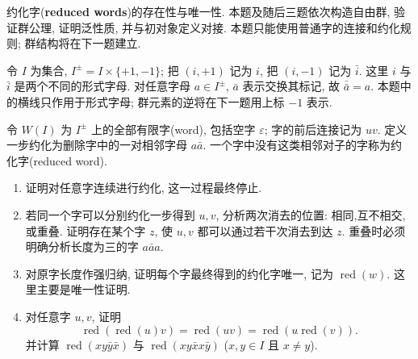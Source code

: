 \documentclass{article}
\begin{document}
\begin{problem}
  {\heiti 约化字}(\textbf{reduced words}){\heiti 的存在性与唯一性}. 本题及随后三题依次构造自由群, 验证群公理, 证明泛性质, 并与初对象定义对接. 本题只能使用普通字的连接和约化规则; 群结构将在下一题建立.

  令 $I$ 为集合, $I^\pm=I\times\{+1,-1\}$; 把 $(i,+1)$ 记为 $i$, 把 $(i,-1)$ 记为 $\bar i$. 这里 $i$ 与 $\bar i$ 是两个不同的形式字母. 对任意字母 $a\in I^\pm$, $\bar a$ 表示交换其标记, 故 $\bar{\bar a}=a$. 本题中的横线只作用于形式字母; 群元素的逆将在下一题用上标 $-1$ 表示.

  令 $W(I)$ 为 $I^\pm$ 上的全部有限字(word), 包括空字 $\varepsilon$; 字的前后连接记为 $uv$. 定义一步约化为删除字中的一对相邻字母 $a\bar a$. 一个字中没有这类相邻对子的字称为约化字(reduced word).
  \begin{enumerate}
    \item[(a)] 证明对任意字连续进行约化, 这一过程最终停止.
    \item[(b)] 若同一个字可以分别约化一步得到 $u,v$, 分析两次消去的位置: 相同,互不相交,或重叠. 证明存在某个字 $z$, 使 $u,v$ 都可以通过若干次消去到达 $z$. 重叠时必须明确分析长度为三的字 $a\bar a a$.
    \item[(c)] 对原字长度作强归纳, 证明每个字最终得到的约化字唯一, 记为 $\operatorname{red}(w)$. 这里主要是唯一性证明.
    \item[(d)] 对任意字 $u,v$, 证明
      \[
        \operatorname{red}(\operatorname{red}(u)v)=\operatorname{red}(uv)
        =\operatorname{red}(u\operatorname{red}(v)).
      \]
      并计算 $\operatorname{red}(xy\bar y\bar x)$ 与 $\operatorname{red}(xy\bar x x\bar y)$ ($x,y\in I$ 且 $x\neq y$).
  \end{enumerate}
\end{problem}
\end{document}
